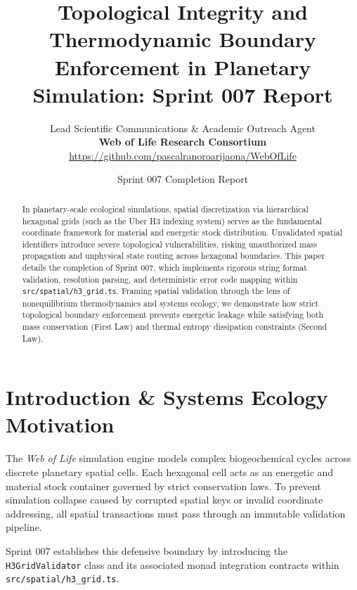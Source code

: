 \documentclass[11pt, a4paper]{article}
\title{\textbf{Topological Integrity and Thermodynamic Boundary Enforcement in Planetary Simulation: Sprint 007 Report}}
\author{Lead Scientific Communications \& Academic Outreach Agent \\ \textbf{Web of Life Research Consortium} \\ \url{https://github.com/pascalranoroarijaona/WebOfLife}}
\date{Sprint 007 Completion Report}
\begin{document}
\maketitle

\begin{abstract}
In planetary-scale ecological simulations, spatial discretization via hierarchical hexagonal grids (such as the Uber H3 indexing system) serves as the fundamental coordinate framework for material and energetic stock distribution. Unvalidated spatial identifiers introduce severe topological vulnerabilities, risking unauthorized mass propagation and unphysical state routing across hexagonal boundaries. This paper details the completion of Sprint 007, which implements rigorous string format validation, resolution parsing, and deterministic error code mapping within \texttt{src/spatial/h3\_grid.ts}. Framing spatial validation through the lens of nonequilibrium thermodynamics and systems ecology, we demonstrate how strict topological boundary enforcement prevents energetic leakage while satisfying both mass conservation (First Law) and thermal entropy dissipation constraints (Second Law).
\end{abstract}

\section{Introduction \& Systems Ecology Motivation}
The \textit{Web of Life} simulation engine models complex biogeochemical cycles across discrete planetary spatial cells. Each hexagonal cell acts as an energetic and material stock container governed by strict conservation laws. To prevent simulation collapse caused by corrupted spatial keys or invalid coordinate addressing, all spatial transactions must pass through an immutable validation pipeline.

Sprint 007 establishes this defensive boundary by introducing the \texttt{H3GridValidator} class and its associated monad integration contracts within \texttt{src/spatial/h3\_grid.ts}.
\end{document}
